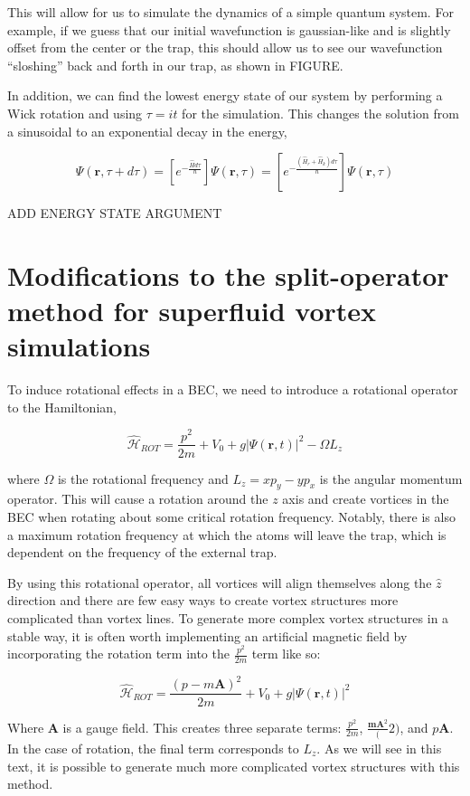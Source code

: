 This will allow for us to simulate the dynamics of a simple quantum system.
For example, if we guess that our initial wavefunction is gaussian-like and is slightly offset from the center or the trap, this should allow us to see our wavefunction ``sloshing'' back and forth in our trap, as shown in FIGURE.

In addition, we can find the lowest energy state of our system by performing a Wick rotation and using $\tau = it$ for the simulation.
This changes the solution from a sinusoidal to an exponential decay in the energy,

$$
\Psi(\mathbf{r},\tau + d\tau) = \left[e^{-\frac{\hat{H}d\tau}{\hbar}}\right]\Psi(\mathbf{r},\tau) = \left[e^{-\frac{(\hat{H}_r + \hat{H}_k)d\tau}{\hbar}}\right]\Psi(\mathbf{r},\tau)
$$

ADD ENERGY STATE ARGUMENT

\section{Modifications to the split-operator method for superfluid vortex simulations}

To induce rotational effects in a BEC, we need to introduce a rotational operator to the Hamiltonian,

$$
\mathcal{\hat H}_{ROT} = \frac{p^2}{2m} + V_0 + g|\Psi(\mathbf{r},t)|^2 - \Omega L_z
$$

where $\Omega$ is the rotational frequency and $L_z = xp_y - yp_x$ is the angular momentum operator.
This will cause a rotation around the $z$ axis and create vortices in the BEC when rotating about some critical rotation frequency.
Notably, there is also a maximum rotation frequency at which the atoms will leave the trap, which is dependent on the frequency of the external trap.

By using this rotational operator, all vortices will align themselves along the $\hat z$ direction and there are few easy ways to create vortex structures more complicated than vortex lines.
To generate more complex vortex structures in a stable way, it is often worth implementing an artificial magnetic field by incorporating the rotation term into the $\frac{p^2}{2m}$ term like so:

$$
\mathcal{\hat H}_{ROT} = \frac{(p-m\mathbf{A})^2}{2m} + V_0 + g|\Psi(\mathbf{r},t)|^2
$$

Where $\mathbf{A}$ is a gauge field.
This creates three separate terms: $\frac{p^2}{2m}$, $\frac{\mathbf{mA}^2}(2)$, and $p\mathbf{A}$.
In the case of rotation, the final term corresponds to $L_z$.
As we will see in this text, it is possible to generate much more complicated vortex structures with this method.

